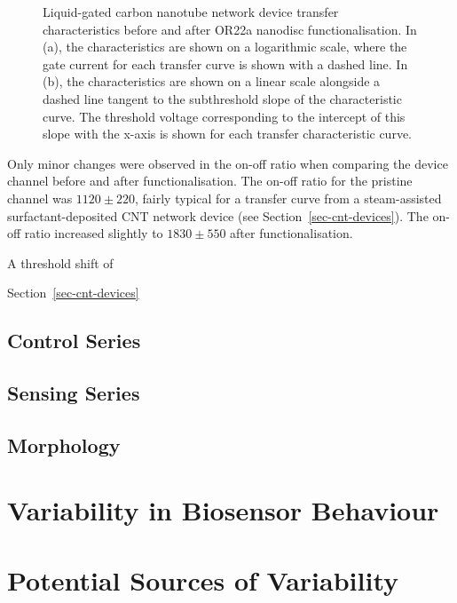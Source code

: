 \documentclass[
  a4paper,
]{scrbook}
\begin{document}
\begin{figure}
\begin{minipage}[t]{0.47\linewidth}
{}

\end{minipage}%

\caption{\label{fig-OR22a-TX-comparison}Liquid-gated carbon nanotube
network device transfer characteristics before and after OR22a nanodisc
functionalisation. In (a), the characteristics are shown on a
logarithmic scale, where the gate current for each transfer curve is
shown with a dashed line. In (b), the characteristics are shown on a
linear scale alongside a dashed line tangent to the subthreshold slope
of the characteristic curve. The threshold voltage corresponding to the
intercept of this slope with the x-axis is shown for each transfer
characteristic curve.}

\end{figure}

Only minor changes were observed in the on-off ratio when comparing the
device channel before and after functionalisation. The on-off ratio for
the pristine channel was \(1120\pm220\), fairly typical for a transfer
curve from a steam-assisted surfactant-deposited CNT network device (see
Section~\ref{sec-cnt-devices}). The on-off ratio increased slightly to
\(1830\pm550\) after functionalisation.

A threshold shift of

Section~\ref{sec-cnt-devices}

\hypertarget{control-series}{%
\subsection{Control Series}\label{control-series}}

\hypertarget{sensing-series}{%
\subsection{Sensing Series}\label{sensing-series}}

\hypertarget{morphology}{%
\subsection{Morphology}\label{morphology}}

\hypertarget{variability-in-biosensor-behaviour}{%
\section{Variability in Biosensor
Behaviour}\label{variability-in-biosensor-behaviour}}

\hypertarget{sec-contamination}{%
\section{Potential Sources of Variability}\label{sec-contamination}}
\end{document}
